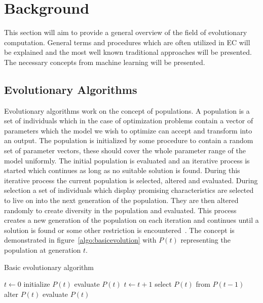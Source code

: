 \section{Background}

This section will aim to provide a general overview of the field of evolutionary computation. General terms and procedures which are often utilized in EC will be explained and the most well known traditional approaches will be presented. The necessary concepts from machine learning will be presented.

\subsection{Evolutionary Algorithms}

Evolutionary algorithms work on the concept of populations. A population is a set of individuals which in the case of optimization problems contain a vector of parameters which the model we wish to optimize can accept and transform into an output. The population is initialized by some procedure to contain a random set of parameter vectors, these should cover the whole parameter range of the model uniformly. The initial population is evaluated and an iterative process is started which continues as long as no suitable solution is found. During this iterative process the current population is selected, altered and evaluated. During selection a set of individuals which display promising characteristics are selected to live on into the next generation of the population. They are then altered randomly to create diversity in the population and evaluated. This process creates a new generation of the population on each iteration and continues until a solution is found or some other restriction is encountered~\cite{Eiben20021}. The concept is demonstrated in figure~\ref{algo:basicevolution} with $P(t)$ representing the population at generation $t$.

\begin{algorithm}[h]

  \caption{Basic evolutionary algorithm}
  \label{algo:basicevolution}
    \begin{algorithmic}
       \State $t\gets 0$
       \State initialize $P(t)$
       \State evaluate $P(t)$
        \State $t\gets t + 1$
        \State select $P(t)$ from $P(t-1)$
        \State alter $P(t)$
        \State evaluate $P(t)$
       \EndWhile
    \end{algorithmic}

\end{algorithm}

